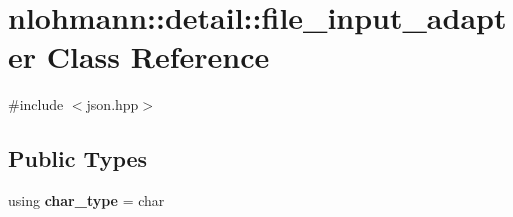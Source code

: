 \hypertarget{classnlohmann_1_1detail_1_1file__input__adapter}{}\section{nlohmann\+:\+:detail\+:\+:file\+\_\+input\+\_\+adapter Class Reference}
\label{classnlohmann_1_1detail_1_1file__input__adapter}


{\ttfamily \#include $<$json.\+hpp$>$}

\subsection*{Public Types}
\begin{DoxyCompactItemize}
\item 
\mbox{\label{classnlohmann_1_1detail_1_1file__input__adapter_ac853c96c60f93dc97433dacd98179f35}} 
using {\bfseries char\+\_\+type} = char
\end{DoxyCompactItemize}
